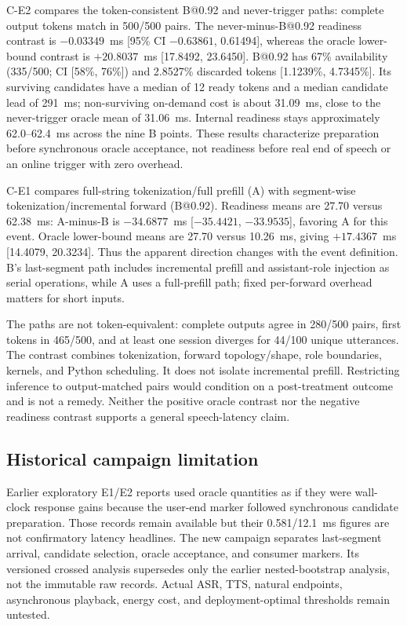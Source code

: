 \documentclass[12pt]{article}
\begin{document}
C-E2 compares the token-consistent B@0.92 and never-trigger paths: complete output tokens match in 500/500 pairs. The never-minus-B@0.92 readiness contrast is $-0.03349$~ms [95\% CI $-0.63861$, 0.61494], whereas the oracle lower-bound contrast is $+20.8037$~ms [17.8492, 23.6450]. B@0.92 has 67\% availability (335/500; CI [58\%, 76\%]) and 2.8527\% discarded tokens [1.1239\%, 4.7345\%]. Its surviving candidates have a median of 12 ready tokens and a median candidate lead of 291~ms; non-surviving on-demand cost is about 31.09~ms, close to the never-trigger oracle mean of 31.06~ms. Internal readiness stays approximately 62.0--62.4~ms across the nine B points. These results characterize preparation before synchronous oracle acceptance, not readiness before real end of speech or an online trigger with zero overhead.

C-E1 compares full-string tokenization/full prefill (A) with segment-wise tokenization/incremental forward (B@0.92). Readiness means are 27.70 versus 62.38~ms: A-minus-B is $-34.6877$~ms [$-35.4421$, $-33.9535$], favoring A for this event. Oracle lower-bound means are 27.70 versus 10.26~ms, giving $+17.4367$~ms [14.4079, 20.3234]. Thus the apparent direction changes with the event definition. B's last-segment path includes incremental prefill and assistant-role injection as serial operations, while A uses a full-prefill path; fixed per-forward overhead matters for short inputs.

The paths are not token-equivalent: complete outputs agree in 280/500 pairs, first tokens in 465/500, and at least one session diverges for 44/100 unique utterances. The contrast combines tokenization, forward topology/shape, role boundaries, kernels, and Python scheduling. It does not isolate incremental prefill. Restricting inference to output-matched pairs would condition on a post-treatment outcome and is not a remedy. Neither the positive oracle contrast nor the negative readiness contrast supports a general speech-latency claim.

\subsection{Historical campaign limitation}

Earlier exploratory E1/E2 reports used oracle quantities as if they were wall-clock response gains because the user-end marker followed synchronous candidate preparation. Those records remain available but their 0.581/12.1~ms figures are not confirmatory latency headlines. The new campaign separates last-segment arrival, candidate selection, oracle acceptance, and consumer markers. Its versioned crossed analysis supersedes only the earlier nested-bootstrap analysis, not the immutable raw records. Actual ASR, TTS, natural endpoints, asynchronous playback, energy cost, and deployment-optimal thresholds remain untested.
\end{document}

